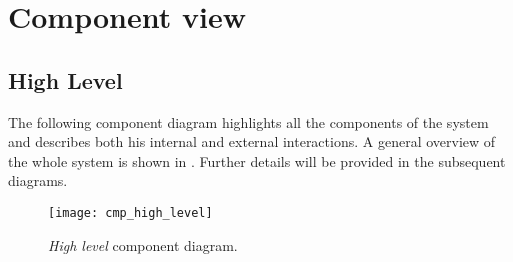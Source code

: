 \section{Component view}

\subsection{High Level}
The following component diagram highlights all the components of the system and describes both his internal and external interactions.
A general overview of the whole system is shown in . Further details will be provided in the subsequent diagrams.

\begin{figure}[H]
	\centering
	\texttt{[image: cmp\_high\_level]}
	\caption{\textit{High level} component diagram.}
	\label{fig:cmp_high_level}
\end{figure}

